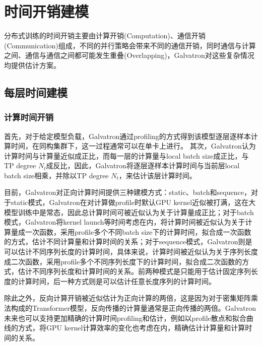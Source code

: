 \documentclass{thuemp}
\begin{document}



\section{时间开销建模}
分布式训练的时间开销主要由计算开销(Computation)、通信开销(Communication)组成，不同的并行策略会带来不同的通信开销，同时通信与计算之间、通信与通信之间都可能发生重叠(Overlapping)，Galvatron对这些复杂情况均提供估计方案。

\subsection{每层时间建模}
\subsubsection{计算时间开销}
首先，对于给定模型负载，Galvatron通过profiling的方式得到该模型逐层逐样本计算时间，在同构集群下，这一过程通常可以在单卡上进行。
其次，Galvatron认为计算时间与计算量近似成正比，而每一层的计算量与local batch size成正比，与TP degree $N_t$成反比，因此，Galvatron将逐层逐样本计算时间与当前层local batch size相乘，并除以TP degree $N_t$，来估计该层计算时间。

目前，Galvatron对正向计算时间提供三种建模方式：static、batch和sequence，对于static模式，Galvatron在对计算做profile时默认GPU kernel近似被打满，这在大模型训练中是常态，因此总计算时间可被近似认为关于计算量成正比；对于batch模式，Galvatron将kernel launch等时间考虑在内，将计算时间被近似认为关于计算量成一次函数，采用profile多个不同batch size下的计算时间，拟合成一次函数的方式，估计不同计算量和计算时间的关系；对于sequence模式，Galvatron则是可以估计不同序列长度的计算时间，具体来说，计算时间被近似认为关于序列长度成二次函数，采用profile多个不同序列长度下的计算时间，拟合成二次函数的方式，估计不同序列长度和计算时间的关系。前两种模式是只能用于估计固定序列长度的计算时间，后一种方式则是可以估计任意长度序列的计算时间。

除此之外，反向计算开销被近似估计为正向计算的两倍，这是因为对于密集矩阵乘法构成的Transformer模型，反向传播的计算量通常是正向传播的两倍。Galvatron未来也可以支持更加精确的计算时间profiling和估计，例如以profile散点和拟合曲线的方式，将GPU kernel计算效率的变化也考虑在内，精确估计计算量和计算时间的关系。
\end{document}

